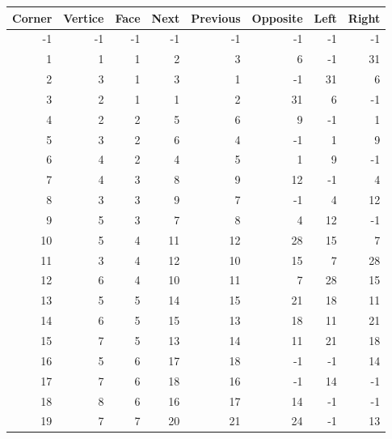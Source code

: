 \documentclass[a4paper]{article}
\begin{document}
\begin{tabular}{rrrrrrrr}
	\hline
	Corner &   Vertice &   Face &   Next &   Previous &   Opposite &   Left &   Right \\
	\hline
	-1 &        -1 &     -1 &     -1 &         -1 &         -1 &     -1 &      -1 \\
	1 &         1 &      1 &      2 &          3 &          6 &     -1 &      31 \\
	2 &         3 &      1 &      3 &          1 &         -1 &     31 &       6 \\
	3 &         2 &      1 &      1 &          2 &         31 &      6 &      -1 \\
	4 &         2 &      2 &      5 &          6 &          9 &     -1 &       1 \\
	5 &         3 &      2 &      6 &          4 &         -1 &      1 &       9 \\
	6 &         4 &      2 &      4 &          5 &          1 &      9 &      -1 \\
	7 &         4 &      3 &      8 &          9 &         12 &     -1 &       4 \\
	8 &         3 &      3 &      9 &          7 &         -1 &      4 &      12 \\
	9 &         5 &      3 &      7 &          8 &          4 &     12 &      -1 \\
	10 &         5 &      4 &     11 &         12 &         28 &     15 &       7 \\
	11 &         3 &      4 &     12 &         10 &         15 &      7 &      28 \\
	12 &         6 &      4 &     10 &         11 &          7 &     28 &      15 \\
	13 &         5 &      5 &     14 &         15 &         21 &     18 &      11 \\
	14 &         6 &      5 &     15 &         13 &         18 &     11 &      21 \\
	15 &         7 &      5 &     13 &         14 &         11 &     21 &      18 \\
	16 &         5 &      6 &     17 &         18 &         -1 &     -1 &      14 \\
	17 &         7 &      6 &     18 &         16 &         -1 &     14 &      -1 \\
	18 &         8 &      6 &     16 &         17 &         14 &     -1 &      -1 \\
	19 &         7 &      7 &     20 &         21 &         24 &     -1 &      13 \\

\end{tabular}
\end{document}
